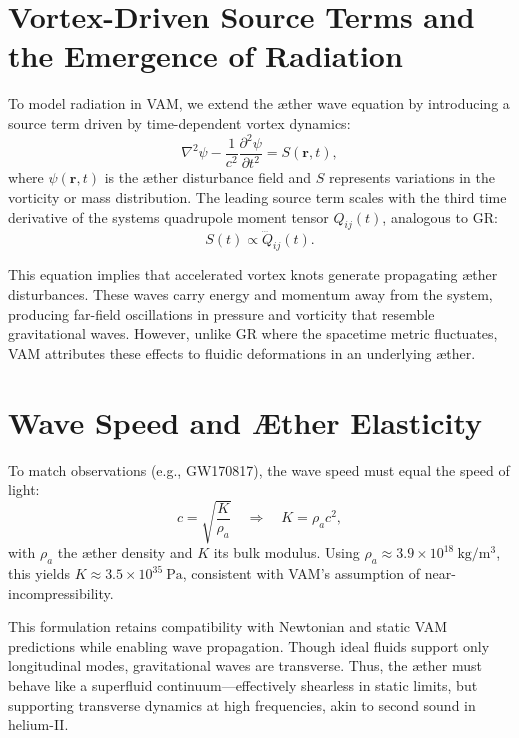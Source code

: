 
\section*{Vortex-Driven Source Terms and the Emergence of Radiation}

To model radiation in VAM, we extend the æther wave equation by introducing a source term driven by time-dependent vortex dynamics:
\begin{equation}
\nabla^2 \psi - \frac{1}{c^2} \frac{\partial^2 \psi}{\partial t^2} = S(\mathbf{r}, t),
\end{equation}
where $\psi(\mathbf{r}, t)$ is the æther disturbance field and $S$ represents variations in the vorticity or mass distribution. The leading source term scales with the third time derivative of the system\rqs s quadrupole moment tensor $Q_{ij}(t)$, analogous to GR:
\begin{equation}
S(t) \propto \dddot{Q}_{ij}(t).
\end{equation}

This equation implies that accelerated vortex knots generate propagating æther disturbances. These waves carry energy and momentum away from the system, producing far-field oscillations in pressure and vorticity that resemble gravitational waves. However, unlike GR where the spacetime metric fluctuates, VAM attributes these effects to fluidic deformations in an underlying æther.

\section*{Wave Speed and Æther Elasticity}

To match observations (e.g., GW170817), the wave speed must equal the speed of light:
\begin{equation}
c = \sqrt{\frac{K}{\rho_a}} \quad \Rightarrow \quad K = \rho_a c^2,
\end{equation}
with $\rho_a$ the æther density and $K$ its bulk modulus. Using $\rho_a \approx 3.9 \times 10^{18}~\mathrm{kg/m^3}$, this yields $K \approx 3.5 \times 10^{35}~\mathrm{Pa}$, consistent with VAM's assumption of near-incompressibility.

This formulation retains compatibility with Newtonian and static VAM predictions while enabling wave propagation. Though ideal fluids support only longitudinal modes, gravitational waves are transverse. Thus, the æther must behave like a superfluid continuum—effectively shearless in static limits, but supporting transverse dynamics at high frequencies, akin to second sound in helium-II.


